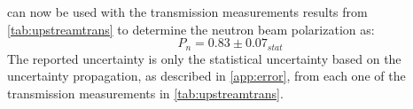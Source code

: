 
 can now be used with the transmission measurements results from \cref{tab:upstreamtrans} to determine the neutron beam polarization as:
\begin{equation}
    P_n = 0.83 \pm 0.07_{stat}
\end{equation}
The reported uncertainty is only the statistical uncertainty based on the uncertainty propagation, as described in \cref{app:error}, from each one of the transmission measurements in \cref{tab:upstreamtrans}. 

